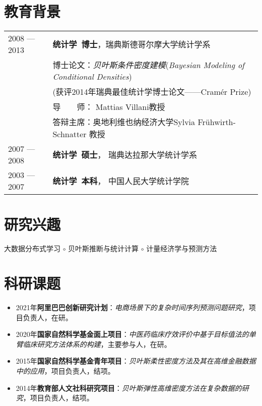 \documentclass[twoside,a4paper,10.5pt]{article}
\begin{document}
\section*{教育背景}

\begin{tabular}{ l  p{}}
  2008 --- 2013 & \textbf{统计学~博士}，瑞典斯德哥尔摩大学统计学系 \\
                & 博士论文：\emph{贝叶斯条件密度建模}(\emph{Bayesian Modeling of Conditional Densities}) \\
                & (获评2014年瑞典最佳统计学博士论文——Cramér Prize) \\
                & 导　　师： Mattias Villani教授        \\
                & 答辩主席：奥地利维也纳经济大学Sylvia Frühwirth-Schnatter 教授 \\
  2007 --- 2008 & \textbf{统计学~硕士}， 瑞典达拉那大学统计学系 \\
  2003 --- 2007 & \textbf{统计学~本科}， 中国人民大学统计学院    \\
\end{tabular}

\section*{研究兴趣}

大数据分布式学习 $\circ$ 贝叶斯推断与统计计算 $\circ$ 计量经济学与预测方法

\section*{科研课题}

\begin{itemize}

\item 2021年\textbf{阿里巴巴创新研究计划}：\emph{电商场景下的复杂时间序列预测问题研究}，项目负责人，在研。
\item 2020年\textbf{国家自然科学基金面上项目}：\emph{中医药临床疗效评价中基于目标值法的单臂临床研究方法体系的构建}，主要参与人，在研。

\item 2015年\textbf{国家自然科学基金青年项目}：\emph{贝叶斯柔性密度方法及其在高维金融数据中的应用}，项目负责人，结项。

\item 2014年\textbf{教育部人文社科研究项目}：\emph{贝叶斯弹性高维密度方法在复杂数据的研究}，项目负责人，结项。


\end{itemize}
\end{document}

